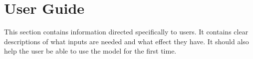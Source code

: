 \section{User Guide}
This section contains information directed specifically to users. It contains clear descriptions of what inputs are needed and what effect they have. It should also help the user be able to use the model for the first time.
